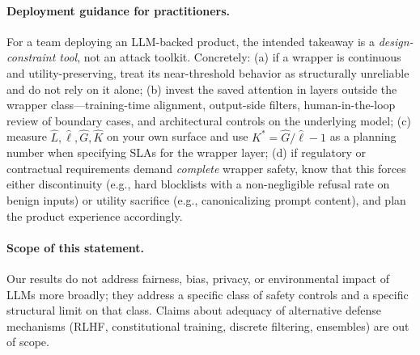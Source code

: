 \paragraph{Deployment guidance for practitioners.}
For a team deploying an LLM-backed product, the intended takeaway is
a \emph{design-constraint tool}, not an attack toolkit. Concretely:
(a) if a wrapper is continuous and utility-preserving, treat its
near-threshold behavior as structurally unreliable and do not rely on
it alone; (b) invest the saved attention in layers outside the
wrapper class---training-time alignment, output-side filters,
human-in-the-loop review of boundary cases, and architectural
controls on the underlying model; (c) measure $\hat L, \hat\ell,
\hat G, \hat K$ on your own surface and use $K^{*} = \hat G/\hat\ell
- 1$ as a planning number when specifying SLAs for the wrapper
layer; (d) if regulatory or contractual requirements demand
\emph{complete} wrapper safety, know that this forces either
discontinuity (e.g., hard blocklists with a non-negligible refusal
rate on benign inputs) or utility sacrifice (e.g., canonicalizing
prompt content), and plan the product experience accordingly.

\paragraph{Scope of this statement.}
Our results do not address fairness, bias, privacy, or environmental
impact of LLMs more broadly; they address a specific class of safety
controls and a specific structural limit on that class. Claims about
adequacy of alternative defense mechanisms (RLHF, constitutional
training, discrete filtering, ensembles) are out of scope.
